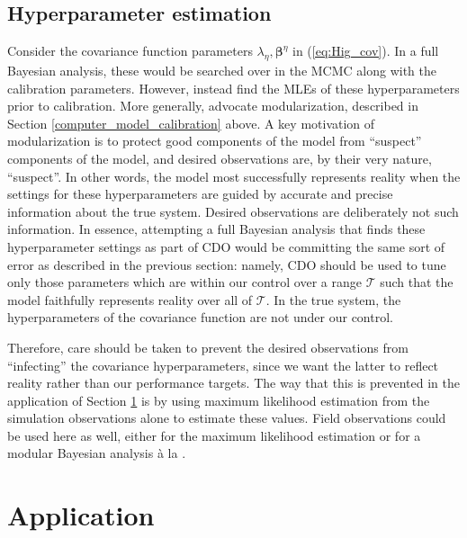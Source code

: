 \documentclass{article}
\begin{document}
\subsection{Hyperparameter estimation}\label{hyperparameter_estimation}
Consider the covariance function parameters $\lambda_\eta,\boldsymbol \beta^\eta$ in (\ref{eq:Hig_cov}). In a full Bayesian analysis, these would be searched over in the MCMC along with the calibration parameters. However, \cite{Kennedy2001} instead find the MLEs of these hyperparameters prior to calibration. More generally, \cite{Liu2009} advocate modularization, described in Section \ref{computer_model_calibration} above. A key motivation of modularization is to protect good components of the model from ``suspect'' components of the model, and desired observations are, by their very nature, ``suspect''. In other words, the model most successfully represents reality when the settings for these hyperparameters are guided by accurate and precise information about the true system. Desired observations are deliberately not such information. In essence, attempting a full Bayesian analysis that finds these hyperparameter settings as part of CDO would be committing the same sort of error as described in the previous section: namely, CDO should be used to tune only those parameters which are within our control over a range $\mathcal T$ such that the model faithfully represents reality over all of $\mathcal T$. In the true system, the hyperparameters of the covariance function are not under our control.

Therefore, care should be taken to prevent the desired observations from ``infecting'' the covariance hyperparameters, since we want the latter to reflect reality rather than our performance targets. The way that this is prevented in the application of Section \ref{application} is by using maximum likelihood estimation from the simulation observations alone to estimate these values. Field observations could be used here as well, either for the maximum likelihood estimation or for a modular Bayesian analysis \`a la \cite{Liu2009}.

\section{Application}\label{application}
\end{document}
